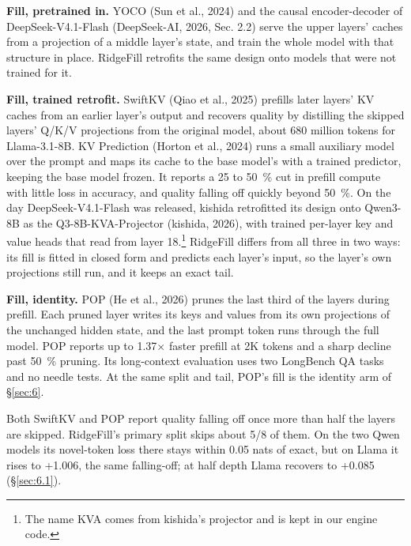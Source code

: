 \documentclass[11pt]{article}
\begin{document}
\textbf{Fill, pretrained in.} YOCO (Sun et al., 2024) and the causal encoder-decoder of DeepSeek-V4.1-Flash (DeepSeek-AI, 2026, Sec. 2.2) serve the upper layers' caches from a projection of a middle layer's state, and train the whole model with that structure in place. RidgeFill retrofits the same design onto models that were not trained for it.

\textbf{Fill, trained retrofit.} SwiftKV (Qiao et al., 2025) prefills later layers' KV caches from an earlier layer's output and recovers quality by distilling the skipped layers' Q/K/V projections from the original model, about 680 million tokens for Llama-3.1-8B. KV Prediction (Horton et al., 2024) runs a small auxiliary model over the prompt and maps its cache to the base model's with a trained predictor, keeping the base model frozen. It reports a 25 to 50~\% cut in prefill compute with little loss in accuracy, and quality falling off quickly beyond 50~\%. On the day DeepSeek-V4.1-Flash was released, kishida retrofitted its design onto Qwen3-8B as the Q3-8B-KVA-Projector (kishida, 2026), with trained per-layer key and value heads that read from layer 18.\footnote{The name KVA comes from kishida's projector and is kept in our engine code.} RidgeFill differs from all three in two ways: its fill is fitted in closed form and predicts each layer's input, so the layer's own projections still run, and it keeps an exact tail.

\textbf{Fill, identity.} POP (He et al., 2026) prunes the last third of the layers during prefill. Each pruned layer writes its keys and values from its own projections of the unchanged hidden state, and the last prompt token runs through the full model. POP reports up to 1.37$\times$ faster prefill at 2K tokens and a sharp decline past 50~\% pruning. Its long-context evaluation uses two LongBench QA tasks and no needle tests. At the same split and tail, POP's fill is the identity arm of \S\ref{sec:6}.

Both SwiftKV and POP report quality falling off once more than half the layers are skipped. RidgeFill's primary split skips about 5/8 of them. On the two Qwen models its novel-token loss there stays within 0.05 nats of exact, but on Llama it rises to +1.006, the same falling-off; at half depth Llama recovers to +0.085 (\S\ref{sec:6.1}).
\end{document}
